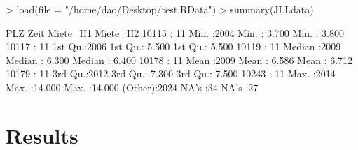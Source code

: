 \documentclass[a4paper,11pt]{article}
\begin{document}
\begin{itemize}
\begin{Schunk}
\begin{Sinput}
> load(file = "/home/dao/Desktop/test.RData")
> summary(JLLdata)
\end{Sinput}
\begin{Soutput}
      PLZ            Zeit         Miete_H1         Miete_H2     
 10115  :  11   Min.   :2004   Min.   : 3.700   Min.   : 3.800  
 10117  :  11   1st Qu.:2006   1st Qu.: 5.500   1st Qu.: 5.500  
 10119  :  11   Median :2009   Median : 6.300   Median : 6.400  
 10178  :  11   Mean   :2009   Mean   : 6.586   Mean   : 6.712  
 10179  :  11   3rd Qu.:2012   3rd Qu.: 7.300   3rd Qu.: 7.500  
 10243  :  11   Max.   :2014   Max.   :14.000   Max.   :14.000  
 (Other):2024                  NA's   :34       NA's   :27      
\end{Soutput}
\end{Schunk}

\end{itemize}
\newpage

\section{Results}\label{Sec:Results}
\end{document}
